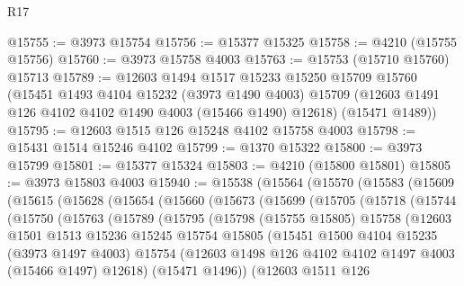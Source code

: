 \begin{lexlean}{R17}
\begin{coremodule}
@15755 := @3973 @15754
@15756 := @15377 @15325
@15758 := @4210 (@15755 @15756)
@15760 := @3973 @15758 @4003
@15763 := @15753 (@15710 @15760) @15713
@15789 := @12603
    @1494
    @1517
    @15233
    @15250
    @15709
    @15760
    (@15451
      @1493
      @4104
      @15232
      (@3973 @1490 @4003)
      @15709
      (@12603 @1491 @126 @4102 @4102 @1490 @4003 (@15466 @1490) @12618)
      (@15471 @1489))
@15795 := @12603 @1515 @126 @15248 @4102 @15758 @4003
@15798 := @15431 @1514 @15246 @4102
@15799 := @1370 @15322
@15800 := @3973 @15799
@15801 := @15377 @15324
@15803 := @4210 (@15800 @15801)
@15805 := @3973 @15803 @4003
@15940 := @15538
    (@15564
      (@15570
        (@15583
          (@15609
            (@15615
              (@15628
                (@15654
                  (@15660
                    (@15673
                      (@15699
                        (@15705
                          (@15718
                            (@15744
                              (@15750
                                (@15763
                                  (@15789
                                    (@15795
                                      (@15798
                                        (@15755 @15805)
                                        @15758
                                        (@12603
                                          @1501
                                          @1513
                                          @15236
                                          @15245
                                          @15754
                                          @15805
                                          (@15451
                                            @1500
                                            @4104
                                            @15235
                                            (@3973 @1497 @4003)
                                            @15754
                                            (@12603
                                              @1498
                                              @126
                                              @4102
                                              @4102
                                              @1497
                                              @4003
                                              (@15466 @1497)
                                              @12618)
                                            (@15471 @1496))
                                          (@12603
                                            @1511
                                            @126

\end{coremodule}
\end{lexlean}
